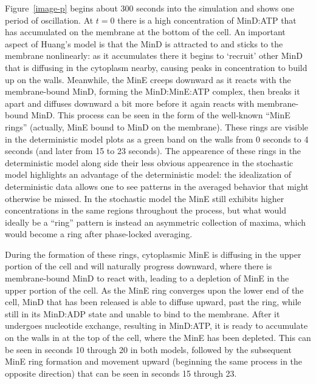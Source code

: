 \documentclass[letterpaper,twocolumn,amsmath,amssymb,pre]{revtex4-1}
\begin{document}
Figure~\ref{image-p} begins about 300 seconds into the simulation and
shows one period of oscillation.  At $t=0$ there is a high
concentration of MinD:ATP that has accumulated on the membrane at the
bottom of the cell. An important aspect of Huang's model is that the
MinD is attracted to and sticks to the membrane nonlinearly: as it
accumulates there it begins to `recruit' other MinD that is diffusing
in the cytoplasm nearby, causing peaks in concentration to build up on
the walls.  Meanwhile, the MinE creeps downward as it reacts with the
membrane-bound MinD, forming the MinD:MinE:ATP complex, then breaks it
apart and diffuses downward a bit more before it again reacts with
membrane-bound MinD.  This process can be seen in the form of the
well-known ``MinE rings'' (actually, MinE bound to MinD on the
membrane).  These rings are visible in the deterministic model plots
as a green band on the walls from 0 seconds to 4 seconds (and later
from 15 to 23 seconds).  The appearence of these rings in the
deterministic model along side their less obvious appearence in the
stochastic model highlights an advantage of the deterministic model:
the idealization of deterministic data allows one to see patterns in
the averaged behavior that might otherwise be missed.  In the
stochastic model the MinE still exhibits higher concentrations in the
same regions throughout the process, but what would ideally be a
``ring'' pattern is instead an asymmetric collection of maxima, which
would become a ring after phase-locked averaging.

During the formation of these rings, cytoplasmic MinE is diffusing in
the upper portion of the cell and will naturally progress downward,
where there is membrane-bound MinD to react with, leading to a
depletion of MinE in the upper portion of the cell.  As the MinE ring
converges upon the lower end of the cell, MinD that has been released
is able to diffuse upward, past the ring, while still in its MinD:ADP
state and unable to bind to the membrane.  After it undergoes
nucleotide exchange, resulting in MinD:ATP, it is ready to accumulate
on the walls in at the top of the cell, where the MinE has been
depleted.  This can be seen in seconds 10 through 20 in both models,
followed by the subsequent MinE ring formation and movement upward
(beginning the same process in the opposite direction) that can be
seen in seconds 15 through 23.
\end{document}

